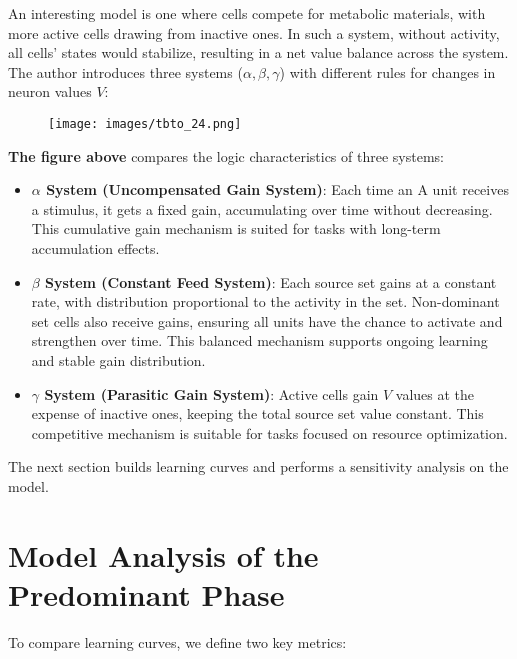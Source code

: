 \documentclass[11p,oneside]{book}
\begin{document}
An interesting model is one where cells compete for metabolic materials, with more active cells drawing from inactive ones. In such a system, without activity, all cells’ states would stabilize, resulting in a net value balance across the system. The author introduces three systems ($\alpha, \beta, \gamma$) with different rules for changes in neuron values $V$:

\begin{figure}[H]
    \centering
    \texttt{[image: images/tbto\_24.png]}
\end{figure}

\textbf{The figure above} compares the logic characteristics of three systems:

\begin{itemize}
    \item \textbf{$\alpha$ System (Uncompensated Gain System)}: Each time an A unit receives a stimulus, it gets a fixed gain, accumulating over time without decreasing. This cumulative gain mechanism is suited for tasks with long-term accumulation effects.
    \item \textbf{$\beta$ System (Constant Feed System)}: Each source set gains at a constant rate, with distribution proportional to the activity in the set. Non-dominant set cells also receive gains, ensuring all units have the chance to activate and strengthen over time. This balanced mechanism supports ongoing learning and stable gain distribution.
    \item \textbf{$\gamma$ System (Parasitic Gain System)}: Active cells gain $V$ values at the expense of inactive ones, keeping the total source set value constant. This competitive mechanism is suitable for tasks focused on resource optimization.
\end{itemize}

The next section builds learning curves and performs a sensitivity analysis on the model.

\section*{Model Analysis of the Predominant Phase}

To compare learning curves, we define two key metrics:
\end{document}
